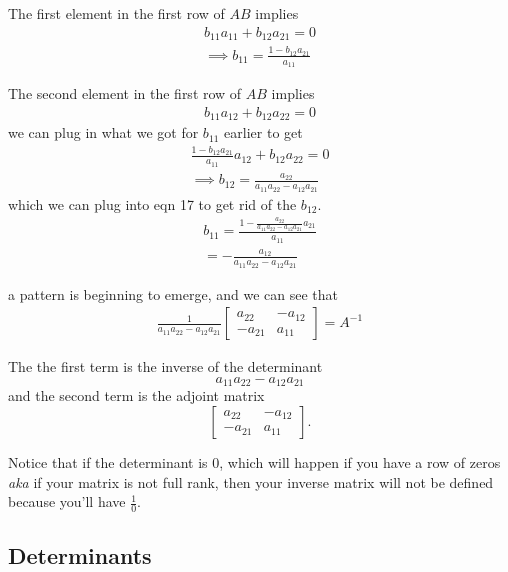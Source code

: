 \documentclass{article}
\begin{document}
The first element in the first row of $AB$ implies 
\begin{align}
    b_{11}a_{11} + b_{12}a_{21} = 0\\
    \implies b_{11} = \frac{1 - b_{12} a_{21}}{a_{11}} 
\end{align}

The second element in the first row of $AB$ implies 
\begin{align}
    b_{11}a_{12} + b_{12}a_{22} = 0 
\end{align}
we can plug in what we got for $b_{11}$ earlier to get 
\begin{align}
     \frac{1 - b_{12} a_{21}}{a_{11}} a_{12} + b_{12}a_{22} = 0 \\
     \implies b_{12} = \frac{a_{22}}{a_{11} a_{22} - a_{12} a_{21}}
\end{align}
which we can plug into eqn 17 to get rid of the $b_{12}$. 
\begin{align}
    b_{11} = \frac{1 - \frac{a_{22}}{a_{11} a_{22} - a_{12} a_{21}} a_{21}}{a_{11}} \\
    = - \frac{a_{12}}{a_{11} a_{22} - a_{12} a_{21}} 
\end{align}

a pattern is beginning to emerge, and we can see that 
\begin{align}
    \frac{1}{a_{11} a_{22} - a_{12} a_{21}} \begin{bmatrix}
        a_{22} & -a_{12}\\
        -a_{21} & a_{11}
    \end{bmatrix} = 
    A^{-1}
\end{align}

The the first term is the inverse of the determinant \[a_{11} a_{22} - a_{12} a_{21}\] and the second term is the adjoint matrix \[\begin{bmatrix}
        a_{22} & -a_{12}\\
        -a_{21} & a_{11}
    \end{bmatrix}.\]

Notice that if the determinant is 0, which will happen if you have a row of zeros \textit{aka} if your matrix is not full rank, then your inverse matrix will not be defined because you'll have $\frac{1}{0}.$\\

\subsection{Determinants}
\end{document}
